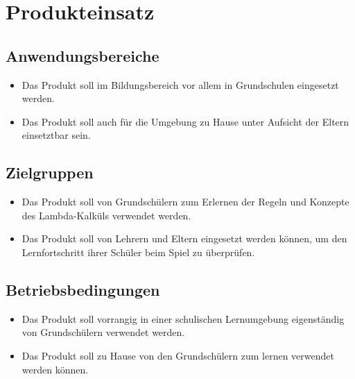 \section{Produkteinsatz}

\subsection{Anwendungsbereiche}
\begin{itemize}
	\item Das Produkt soll im Bildungsbereich vor allem in Grundschulen eingesetzt werden.
	\item Das Produkt soll auch für die Umgebung zu Hause unter Aufsicht der Eltern einsetztbar sein.
\end{itemize}


\subsection{Zielgruppen}

\begin{itemize}
	\item Das Produkt soll von Grundschülern zum Erlernen der Regeln und Konzepte des Lambda-Kalküls verwendet werden.
	\item Das Produkt soll von Lehrern und Eltern eingesetzt werden können, um den Lernfortschritt ihrer Schüler beim Spiel zu überprüfen.
\end{itemize}

\subsection{Betriebsbedingungen}
\begin{itemize}
	\item Das Produkt soll vorrangig  in einer schulischen Lernumgebung eigenständig von Grundschülern verwendet werden.
	\item Das Produkt soll  zu Hause von den Grundschülern zum lernen verwendet werden können.
\end{itemize}
